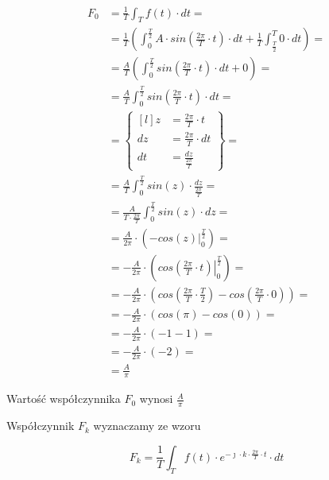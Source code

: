 \begin{task}
\begin{align*}
F_0&=\frac{1}{T}\int_{T}f(t) \cdot dt=\\
&=\frac{1}{T}\left(\int_{0}^{\frac{T}{2}}A \cdot sin\left( \frac{2\pi}{T} \cdot t\right) \cdot dt 
+ \frac{1}{T}\int_{\frac{T}{2}}^{T}0 \cdot dt \right)=\\
&=\frac{A}{T}\left(\int_{0}^{\frac{T}{2}}sin\left( \frac{2\pi}{T} \cdot t\right) \cdot dt 
+ 0 \right)=\\
&=\frac{A}{T}\int_{0}^{\frac{T}{2}}sin\left( \frac{2\pi}{T} \cdot t\right) \cdot dt=\\
&=\begin{Bmatrix*}[l]
z&=\frac{2\pi}{T} \cdot t\\
dz&=\frac{2\pi}{T} \cdot dt\\
dt&=\frac{dz}{\frac{2\pi}{T}}
\end{Bmatrix*}=\\
&=\frac{A}{T}\int_{0}^{\frac{T}{2}}sin\left( z\right) \cdot \frac{dz}{\frac{2\pi}{T}}=\\
&=\frac{A}{T\cdot \frac{2\pi}{T}}\int_{0}^{\frac{T}{2}}sin\left( z\right) \cdot dz=\\
&=\frac{A}{2\pi}\cdot \left(\left . -cos\left( z\right) \right|_{0}^{\frac{T}{2}}\right)=\\
&=-\frac{A}{2\pi}\cdot \left(\left . cos\left( \frac{2\pi}{T} \cdot t\right) \right|_{0}^{\frac{T}{2}}\right)=\\
&=-\frac{A}{2\pi}\cdot \left( cos\left( \frac{2\pi}{T} \cdot \frac{T}{2}\right) - cos\left( \frac{2\pi}{T} \cdot 0\right)\right)=\\
&=-\frac{A}{2\pi}\cdot \left( cos\left( \pi\right) - cos\left( 0\right)\right)=\\
&=-\frac{A}{2\pi}\cdot \left( -1 - 1\right)=\\
&=-\frac{A}{2\pi}\cdot \left( -2\right)=\\
&=\frac{A}{\pi}
\end{align*}

Wartość współczynnika $F_0$ wynosi $\frac{A}{\pi}$

Współczynnik $F_k$ wyznaczamy ze wzoru

\begin{equation}
F_k=\frac{1}{T}\int_{T}f(t) \cdot e^{-\jmath \cdot k \cdot \frac{2\pi}{T} \cdot t} \cdot dt
\end{equation}


\end{task}
